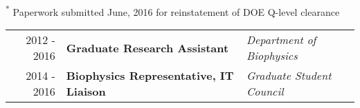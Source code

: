 \begin{center}
\begin{minipage}{\textwidth}
\begin{itemize}
	\end{itemize}
\end{minipage}
    \end{center}

\begin{minipage}{\textwidth}
\begin{center}
\footnotesize \textsuperscript{*} Paperwork submitted June, 2016 for reinstatement of DOE Q-level clearance
\end{center}
\end{minipage}


\begin{minipage}{\textwidth}
	\begin{tabular}{r|ll}
		2012 - 2016 & \textbf{Graduate Research Assistant} & \textit{Department of Biophysics}  \\
		2014 - 2016 & \textbf{Biophysics Representative, IT Liaison} & \textit{Graduate Student Council}  \\
	\end{tabular}
\end{minipage}

